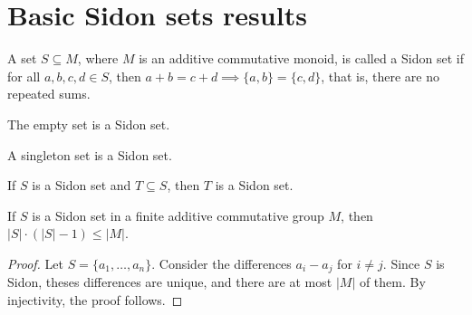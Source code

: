 %

\section{Basic Sidon sets results}

\begin{definition}\leanok\label{def:sidon_set}
    A set $S \subseteq M$, where $M$ is an additive commutative monoid, is called a Sidon set if for all $a, b, c, d \in S$, then $a + b = c + d \implies \{a, b\} = \{c, d\}$, that is, there are no repeated sums.
\end{definition}

\begin{theorem}\leanok{}
    The empty set is a Sidon set.
\end{theorem}

\begin{theorem}\leanok{}
    A singleton set is a Sidon set.
\end{theorem}

\begin{theorem}\leanok{}
    If $S$ is a Sidon set and $T \subseteq S$, then $T$ is a Sidon set.
\end{theorem}

\begin{theorem}\leanok{}
    If $S$ is a Sidon set in a finite additive commutative group $M$, then $|S| \cdot (|S| - 1) \leq |M|$.
\end{theorem}
\begin{proof}
    Let $S = \{a_1, \ldots, a_n\}$. Consider the differences $a_i - a_j$ for $i \neq j$.
    Since $S$ is Sidon, theses differences are unique, and there are at most $|M|$ of them.
    By injectivity, the proof follows.
\end{proof}
